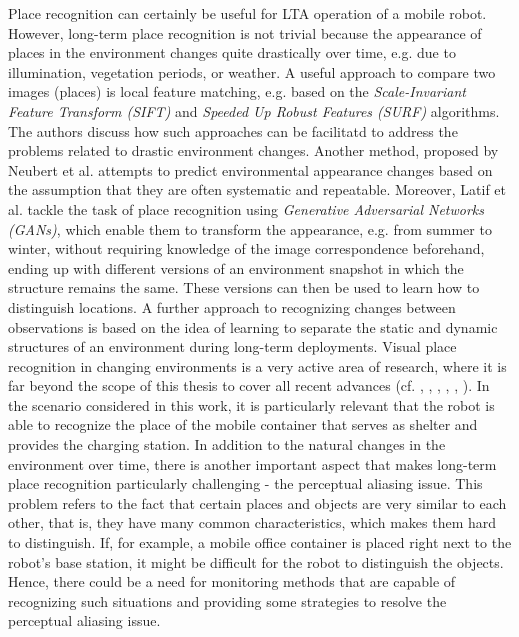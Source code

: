 \documentclass[english, master, utf8]{base/thesis_KBS}
\begin{document}
\noindent
Place recognition can certainly be useful for LTA operation of a mobile robot. However, long-term place recognition is not trivial because 
the appearance of places in the environment changes quite drastically over time, e.g. due to illumination, vegetation periods, or weather. \cite{Han:2018}
A useful approach to compare two images (places) is local feature matching, e.g. based on the \textit{Scale-Invariant Feature Transform (SIFT)} and
\textit{Speeded Up Robust Features (SURF)} algorithms. \cite{Valgren:2007} The authors discuss how such approaches can be facilitatd to address the problems related to drastic
environment changes. Another method, proposed by Neubert et al. \cite{Neubert:2013} attempts to predict environmental appearance changes based on the assumption that they are
often systematic and repeatable. Moreover, Latif et al. tackle the task of place recognition using \textit{Generative Adversarial Networks (GANs)}, which enable them to transform the appearance, e.g. from summer
to winter, without requiring knowledge of the image correspondence beforehand, ending up with different versions of an environment snapshot in which the structure remains the same.
\cite{Latif:2018} These versions can then be used to learn how to distinguish locations. A further approach to recognizing changes between observations is based on the idea of
learning to separate the static and dynamic structures of an environment during long-term deployments. \cite{Ambrus:2014}
Visual place recognition in changing environments is a very active area of research, where it is far beyond the scope of this thesis to cover all recent advances (cf. \cite{Porav:2018},
\cite{LowrySur:2016}, \cite{Suenderhauf:2013}, \cite{Lowry:2016}, \cite{Milford:2012}, \cite{Churchill:2013}). In the scenario considered in this work, it is particularly relevant that the robot is able to recognize the place of the mobile container
that serves as shelter and provides the charging station. In addition to the natural changes in the environment over time, there is another important aspect
that makes long-term place recognition particularly challenging - the perceptual aliasing issue. This problem refers to the fact that certain places and objects are very 
similar to each other, that is, they have many common characteristics, which makes them hard to distinguish. \cite{Han:2018}
If, for example, a mobile office container is placed right next to the robot's base station, it might be difficult for the robot to distinguish the objects.
Hence, there could be a need for monitoring methods that are capable of recognizing such situations and providing some strategies to resolve the perceptual aliasing issue.\newline
\end{document}
